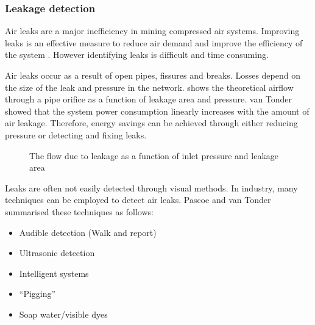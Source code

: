		 \subsubsection{Leakage detection}	 
		 Air leaks are a major inefficiency in mining compressed air systems. Improving leaks is an effective measure to reduce air demand and improve the efficiency of the system \cite{van2011sustaining}. However identifying leaks is difficult and time consuming.
		 \par 
		  Air leaks occur as a result of open pipes, fissures and breaks. Losses depend on the size of the leak and pressure in the network.  shows the theoretical airflow through a pipe orifice as a function of leakage area and pressure\footnotemark[1]. van Tonder \cite{van2011sustaining} showed that the system power consumption linearly increases with the amount of air leakage. Therefore, energy savings can be achieved through either reducing pressure or detecting and fixing leaks.
		 \begin{figure}[!htbp]
		 	\centering
		 	\fbox{\hspace{1.5cm}\hspace{1.5cm}}
		 	\caption[The flow due to leakage as a function of inlet pressure and leakage area]{ The flow due to leakage as a function of inlet pressure and leakage area\protect\footnotemark[1]}
		 	\label{fig: Leak losses}
		 \end{figure}
	 \par 
		 Leaks are often not easily detected through visual methods. In industry, many techniques can be employed to detect air leaks. Pascoe \cite{Pascoe2016Masters} and van Tonder \cite{vanTonder2010Masters} summarised these techniques as follows:
		 \begin{itemize}
		 	\item Audible detection (Walk and report)
		 	\item Ultrasonic detection
		 	\item Intelligent systems\footnotemark[2]
		 	\item \enquote{Pigging}\footnotemark[3]
		 	\item Soap water/visible dyes 
		 \end{itemize}
